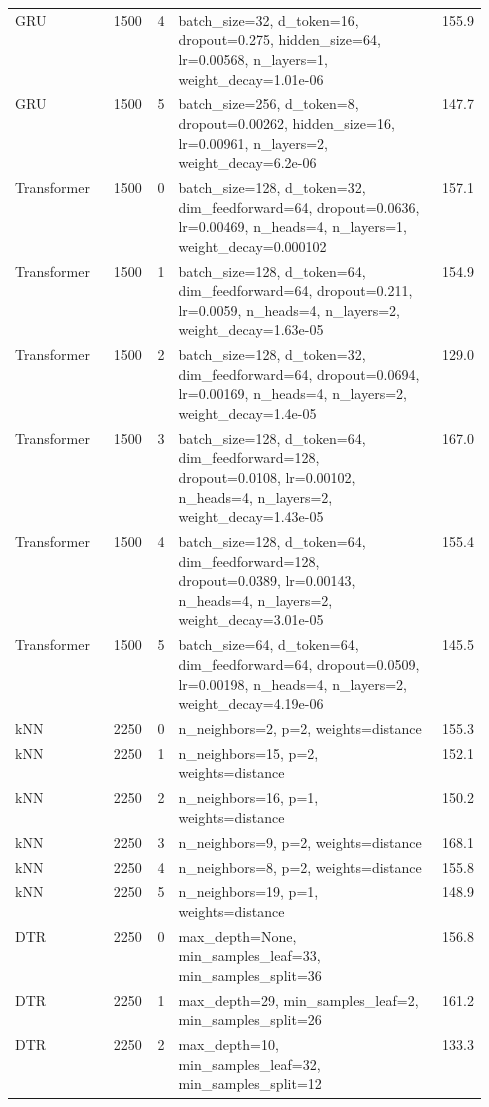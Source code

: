 \begin{longtable}{lrrp{0.55\linewidth}r}
GRU & 1500 & 4 & batch\_size=32, d\_token=16, dropout=0.275, hidden\_size=64, lr=0.00568, n\_layers=1, weight\_decay=1.01e-06 & 155.9 \\
GRU & 1500 & 5 & batch\_size=256, d\_token=8, dropout=0.00262, hidden\_size=16, lr=0.00961, n\_layers=2, weight\_decay=6.2e-06 & 147.7 \\
Transformer & 1500 & 0 & batch\_size=128, d\_token=32, dim\_feedforward=64, dropout=0.0636, lr=0.00469, n\_heads=4, n\_layers=1, weight\_decay=0.000102 & 157.1 \\
Transformer & 1500 & 1 & batch\_size=128, d\_token=64, dim\_feedforward=64, dropout=0.211, lr=0.0059, n\_heads=4, n\_layers=2, weight\_decay=1.63e-05 & 154.9 \\
Transformer & 1500 & 2 & batch\_size=128, d\_token=32, dim\_feedforward=64, dropout=0.0694, lr=0.00169, n\_heads=4, n\_layers=2, weight\_decay=1.4e-05 & 129.0 \\
Transformer & 1500 & 3 & batch\_size=128, d\_token=64, dim\_feedforward=128, dropout=0.0108, lr=0.00102, n\_heads=4, n\_layers=2, weight\_decay=1.43e-05 & 167.0 \\
Transformer & 1500 & 4 & batch\_size=128, d\_token=64, dim\_feedforward=128, dropout=0.0389, lr=0.00143, n\_heads=4, n\_layers=2, weight\_decay=3.01e-05 & 155.4 \\
Transformer & 1500 & 5 & batch\_size=64, d\_token=64, dim\_feedforward=64, dropout=0.0509, lr=0.00198, n\_heads=4, n\_layers=2, weight\_decay=4.19e-06 & 145.5 \\
\midrule
kNN & 2250 & 0 & n\_neighbors=2, p=2, weights=distance & 155.3 \\
kNN & 2250 & 1 & n\_neighbors=15, p=2, weights=distance & 152.1 \\
kNN & 2250 & 2 & n\_neighbors=16, p=1, weights=distance & 150.2 \\
kNN & 2250 & 3 & n\_neighbors=9, p=2, weights=distance & 168.1 \\
kNN & 2250 & 4 & n\_neighbors=8, p=2, weights=distance & 155.8 \\
kNN & 2250 & 5 & n\_neighbors=19, p=1, weights=distance & 148.9 \\
DTR & 2250 & 0 & max\_depth=None, min\_samples\_leaf=33, min\_samples\_split=36 & 156.8 \\
DTR & 2250 & 1 & max\_depth=29, min\_samples\_leaf=2, min\_samples\_split=26 & 161.2 \\
DTR & 2250 & 2 & max\_depth=10, min\_samples\_leaf=32, min\_samples\_split=12 & 133.3 \\

\end{longtable}
